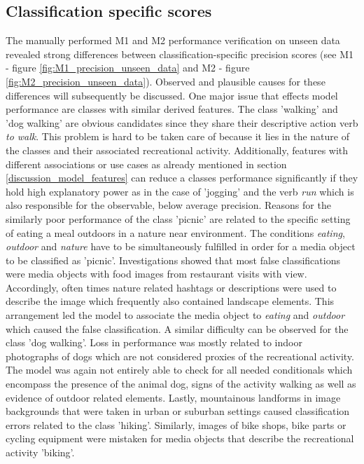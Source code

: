\subsection{Classification specific scores}\label{discussion_class_specific_perform}
The manually performed M1 and M2 performance verification on unseen data revealed strong differences between classification-specific precision scores (see M1 - figure \ref{fig:M1_precision_unseen_data} and M2 - figure \ref{fig:M2_precision_unseen_data}). Observed and plausible causes for these differences will subsequently be discussed.
One major issue that effects model performance are classes with similar derived features. The class 'walking' and 'dog walking' are obvious candidates since they share their descriptive action verb \textit{to walk}. This problem is hard to be taken care of because it lies in the nature of the classes and their associated recreational activity.
Additionally, features with different associations or use cases as already mentioned in section \ref{discussion_model_features} can reduce a classes performance significantly if they hold high explanatory power as in the case of 'jogging' and the verb \textit{run} which is also responsible for the observable, below average precision. Reasons for the similarly poor performance of the class 'picnic' are related to the specific setting of eating a meal outdoors in a nature near environment. The conditions \textit{eating}, \textit{outdoor} and \textit{nature} have to be simultaneously fulfilled in order for a media object to be classified as 'picnic'. Investigations showed that most false classifications were media objects with food images from restaurant visits with view. Accordingly, often times nature related hashtags or descriptions were used to describe the image which frequently also contained landscape elements. This arrangement led the model to associate the media object to \textit{eating} and \textit{outdoor} which caused the false classification. A similar difficulty can be observed for the class 'dog walking'. Loss in performance was mostly related to indoor photographs of dogs which are not considered proxies of the recreational activity. The model was again not entirely able to check for all needed conditionals which encompass the presence of the animal dog, signs of the activity walking as well as evidence of outdoor related elements. Lastly, mountainous landforms in image backgrounds that were taken in urban or suburban settings caused classification errors related to the class 'hiking'. Similarly, images of bike shops, bike parts or cycling equipment were mistaken for media objects that describe the recreational activity 'biking'. \\

